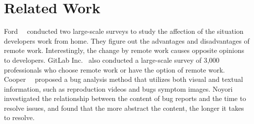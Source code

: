 \section{Related Work}
\label{sec:relate}

Ford~\et~\citep{ford2021TOSEM} conducted 
two large-scale surveys to study the affection of 
the situation developers work from home. 
They figure out the advantages and disadvantages of 
remote work. 
Interestingly, the change by remote work causes opposite opinions 
to developers. 
GitLab Inc.~\citep{gitlab2020survey} also conducted
a large-scale survey of 3,000 professionals 
who choose remote work or have the option of remote work. 
Cooper~\et~\citep{9402526} proposed a bug analysis method 
that utilizes both visual and textual information, 
such as reproduction videos and bugs symptom images.
Noyori~\et~\citep{9498236} investigated the relationship between the content of bug reports and the time to resolve issues, 
and found that the more abstract the content, the longer it takes to resolve.

